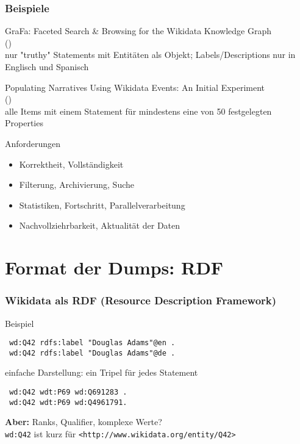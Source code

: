 \documentclass[aspectratio=1610,xcolor=svgnames]{beamer}
\begin{document}
\begin{frame}[fragile]\frametitle{Beispiele}
  GraFa: Faceted Search \& Browsing for the Wikidata Knowledge Graph \\
  (\cite{usage-grafa}) \\
nur "truthy" Statements mit Entitäten als Objekt;
  Labels/Descriptions nur in Englisch und Spanisch \\
  \vspace{0.5cm}

  Populating Narratives Using Wikidata Events: An Initial Experiment \\
  (\cite{usage-narratives}) \\
  alle  Items mit einem Statement für mindestens eine von 50 festgelegten
  Properties
\end{frame}

\begin{frame}{Anforderungen}
  \begin{itemize}
    \item Korrektheit, Vollständigkeit
    \item Filterung, Archivierung, Suche
    \item Statistiken, Fortschritt, Parallelverarbeitung
    \item Nachvollziehrbarkeit, Aktualität der Daten
  \end{itemize}
\end{frame}

\section{Format der Dumps: RDF}

\begin{frame}[t, fragile]\frametitle{Wikidata als RDF (Resource Description Framework)}
  \vspace{0.25cm}

  \begin{block}{Beispiel}
  \begin{verbatim}
 wd:Q42 rdfs:label "Douglas Adams"@en .
 wd:Q42 rdfs:label "Douglas Adams"@de .
  \end{verbatim}
  \end{block}

  \begin{block}{einfache Darstellung: ein Tripel für jedes Statement}
  \begin{verbatim}
 wd:Q42 wdt:P69 wd:Q691283 .
 wd:Q42 wdt:P69 wd:Q4961791.
  \end{verbatim}
  \end{block}

  \textbf{Aber:} Ranks, Qualifier, komplexe Werte? \\
  \vspace{0.5cm}
  \footnotesize{\verb|wd:Q42| ist kurz für \verb|<http://www.wikidata.org/entity/Q42>|}
\end{frame}
\end{document}
